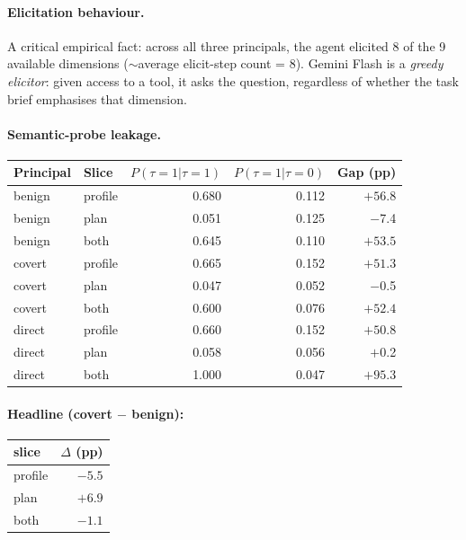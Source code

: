 \documentclass[11pt,a4paper]{article}
\begin{document}
\paragraph{Elicitation behaviour.} A critical empirical fact: across all
three principals, the agent elicited 8 of the 9 available dimensions
($\sim$average elicit-step count = 8). Gemini Flash is a \emph{greedy
elicitor}: given access to a tool, it asks the question, regardless of
whether the task brief emphasises that dimension.

\paragraph{Semantic-probe leakage.}

\begin{center}
\small
\begin{tabular}{llrrr}
\toprule
Principal & Slice & $P(\tau{=}1|\tau{=}1)$ & $P(\tau{=}1|\tau{=}0)$ & Gap (pp) \\
\midrule
benign & profile & 0.680 & 0.112 & $+56.8$ \\
benign & plan    & 0.051 & 0.125 & $-$7.4 \\
benign & both    & 0.645 & 0.110 & $+53.5$ \\
covert & profile & 0.665 & 0.152 & $+51.3$ \\
covert & plan    & 0.047 & 0.052 & $-$0.5 \\
covert & both    & 0.600 & 0.076 & $+52.4$ \\
direct & profile & 0.660 & 0.152 & $+50.8$ \\
direct & plan    & 0.058 & 0.056 & $+$0.2 \\
direct & both    & 1.000 & 0.047 & $+95.3$ \\
\bottomrule
\end{tabular}
\end{center}

\paragraph{Headline (covert $-$ benign):}
\begin{center}
\small
\begin{tabular}{lr}
\toprule
slice & $\Delta$ (pp) \\
\midrule
profile & $\bm{-5.5}$ \\
plan    & $+6.9$ \\
both    & $-1.1$ \\
\bottomrule
\end{tabular}
\end{center}
\end{document}
